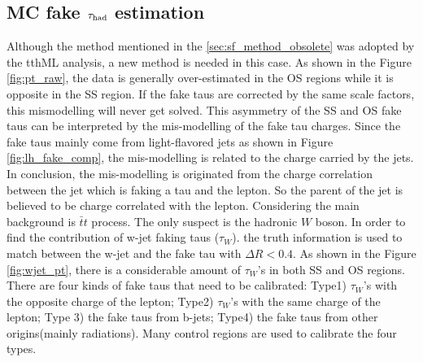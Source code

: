 \subsection{MC fake $\tau_\text{had}$ estimation}
\label{sec:sf_method}

Although the method mentioned in the \ref{sec:sf_method_obsolete} was adopted by the tthML analysis, a new method is needed in this case. As shown in the Figure \ref{fig:pt_raw}, the data is generally over-estimated in the OS regions while it is opposite in the SS region. If the fake taus are corrected by the same scale factors, this mismodelling will never get solved. This asymmetry of the SS and OS fake taus can be interpreted by the mis-modelling of the fake tau charges. Since the fake taus mainly come from light-flavored jets as shown in Figure \ref{fig:lh_fake_comp}, the mis-modelling is related to the charge carried by the jets. In conclusion, the mis-modelling is originated from the charge correlation between the jet which is faking a tau and the lepton. So the parent of the jet is believed to be charge correlated with the lepton. Considering the main background is $\bar{t}t$ process. The only suspect is the hadronic $W$ boson. In order to find the contribution of w-jet faking taus ($\tau_{W}$).  the truth information is used to match between the w-jet and the fake tau with $\Delta R < 0.4$. As shown in the Figure \ref{fig:wjet_pt}, there is a considerable amount of $\tau_{W}$'s in both SS and OS regions. There are four kinds of fake taus that need to be calibrated: Type1) $\tau_{W}$'s with the opposite charge of the lepton; Type2) $\tau_{W}$'s with the same charge of the lepton; Type 3) the fake taus from b-jets; Type4) the fake taus from other origins(mainly radiations). Many control regions are used to calibrate the four types.


